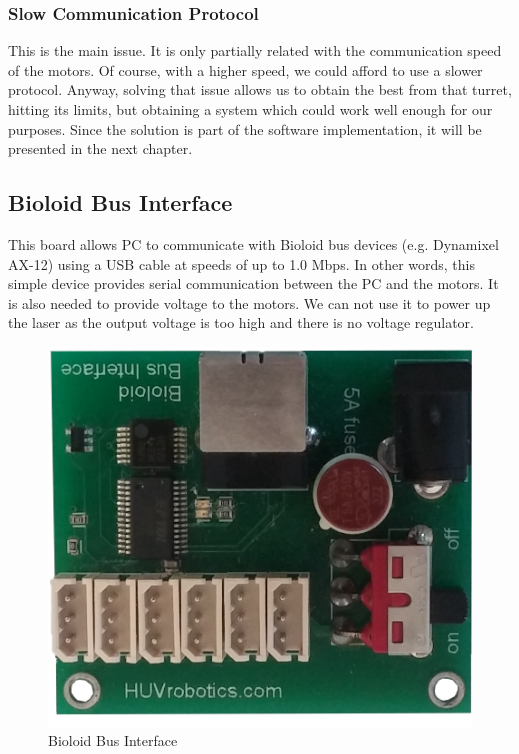 \subsubsection{Slow Communication Protocol}
This is the main issue. It is only partially related with the communication speed of the motors. Of course, with a higher speed, we could afford to use a slower protocol. Anyway, solving that issue allows us to obtain the best from that turret, hitting its limits, but obtaining a system which could work well enough for our purposes. Since the solution is part of the software implementation, it will be presented in the next chapter.

\subsection{Bioloid Bus Interface}
This board allows PC to communicate with Bioloid bus devices (e.g. Dynamixel AX-12) using a USB cable at speeds of up to 1.0 Mbps. In other words,
this simple device provides serial communication between the PC and the motors. It is also needed to provide voltage to the motors. We can not use it to power up the laser as the output voltage is too high and there is no voltage regulator.
\begin{figure}[h]
	\centering
	\includegraphics[width=.5\textwidth]{img/bioloid.png}%
	\caption{Bioloid Bus Interface}
	\label{fig:busInterface}
\end{figure}
